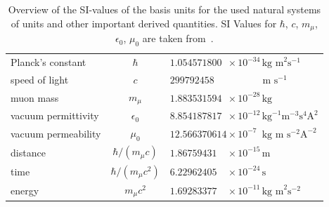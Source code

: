 \begin{table}[h]
\caption{\label{tab:units}Overview of the SI-values of the basis units for the used natural systems of units and other important derived quantities. SI Values for $\hbar$, $c$, $m_\mu$, $\epsilon_0$, $\mu_0$ are taken from~\cite{codata2016}.}
\centering\setcellgapes{4pt}\makegapedcells
\begin{tabular}{lc|ll}
\\
Planck's constant &$\hbar$ & \multicolumn{2}{l}{$1.054571800 \phantom{1}\times 10^{-34} \,\text{kg m}^2 \text{s}^{-1}$} \\
speed of light &$c$ & \multicolumn{2}{l}{$299792458\phantom{1} \,\,\phantom{\times 1001 ^{-34}} \text{m s}^{-1}$}\\
muon mass &$m_\mu$ & \multicolumn{2}{l}{$1.883531594\phantom{1} \times 10^{-28} \,\text{kg}$}\\
vacuum permittivity &$\epsilon_0$ & \multicolumn{2}{l}{$8.854187817\phantom{1} \times 10^{-12} \,  \text{kg}^{-1} \text{m}^{-3}\text{s}^4\text{A}^2$}\\
vacuum permeability &$\mu_0$ & \multicolumn{2}{l}{$12.566370614 \times 10^{-7\phantom{1}} \,\text{kg m} \text{ s}^{-2}\text{A}^{-2}$}\\[15pt]
distance & $\hbar/(m_\mu c)$ & $1.86759431\phantom{11}\times 10^{-15}\,\text{m}$\\
time & $\hbar /(m_\mu c^2)$ & $6.22962405\phantom{11}\times 10^{-24}\,\text{s}$\\
energy & $m_\mu c^2$ & $1.69283377\phantom{11}\times 10^{-11}\,\text{kg m}^2\text{s}^{-2}$\\
\end{tabular}
\end{table}


